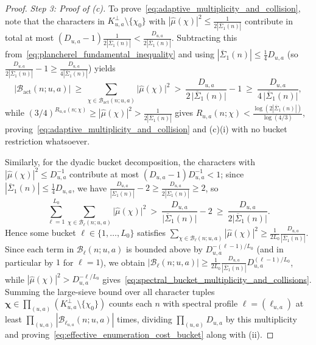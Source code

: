 \documentclass[11pt, a4paper]{article}
\theoremstyle{plain}
\theoremstyle{definition}
\begin{document}
\begin{proof}
\medskip\noindent\emph{Step 3: Proof of (c).}
To prove~\eqref{eq:adaptive_multiplicity_and_collision}, note that the characters in $K_{u,a}^{\perp}\setminus\{\chi_0\}$ with $|\widehat{\mu}(\chi)|^{2}\le\frac{1}{2|\overline{\Sigma}_1(n)|}$ contribute in total at most $(D_{u,a}-1)\frac{1}{2|\overline{\Sigma}_1(n)|}<\frac{D_{u,a}}{2|\overline{\Sigma}_1(n)|}$. Subtracting this from~\eqref{eq:plancherel_fundamental_inequality} and using $|\overline{\Sigma}_1(n)|\le\frac14 D_{u,a}$ (so $\frac{D_{u,a}}{2|\overline{\Sigma}_1(n)|}-1\ge\frac{D_{u,a}}{4|\overline{\Sigma}_1(n)|}$) yields
\[
\big|\mathcal{B}_{\mathrm{act}}(n;u,a)\big|\ \ge\ \sum_{\chi\in\mathcal{B}_{\mathrm{act}}(n;u,a)}\big|\widehat{\mu}(\chi)\big|^{2}\ >\ \frac{D_{u,a}}{2\,\big|\overline{\Sigma}_1(n)\big|}-1\ \ge\ \frac{D_{u,a}}{4\,\big|\overline{\Sigma}_1(n)\big|},
\]
while $(3/4)^{R_{u,a}(n;\chi)}\ge|\widehat{\mu}(\chi)|^{2}>\frac{1}{2|\overline{\Sigma}_1(n)|}$ gives $R_{u,a}(n;\chi)<\frac{\log(2|\overline{\Sigma}_1(n)|)}{\log(4/3)}$, proving~\eqref{eq:adaptive_multiplicity_and_collision} and (c)(i) with no bucket restriction whatsoever. 

Similarly, for the dyadic bucket decomposition, the characters with $|\widehat{\mu}(\chi)|^{2}\le D_{u,a}^{-1}$ contribute at most $(D_{u,a}-1)D_{u,a}^{-1}<1$; since $|\overline{\Sigma}_1(n)|\le\frac14 D_{u,a}$, we have $\frac{D_{u,a}}{|\overline{\Sigma}_1(n)|}-2\ge\frac{D_{u,a}}{2|\overline{\Sigma}_1(n)|}\ge2$, so
\[
\sum_{\ell=1}^{L_0}\sum_{\chi\in\mathcal{B}_\ell(n;u,a)}\big|\widehat{\mu}(\chi)\big|^{2}\ >\ \frac{D_{u,a}}{\big|\overline{\Sigma}_1(n)\big|}-2\ \ge\ \frac{D_{u,a}}{2\big|\overline{\Sigma}_1(n)\big|}.
\]
Hence some bucket $\ell\in\{1,\dots,L_0\}$ satisfies $\sum_{\chi\in\mathcal{B}_\ell(n;u,a)}|\widehat{\mu}(\chi)|^{2}\ge\frac{1}{2L_0}\frac{D_{u,a}}{|\overline{\Sigma}_1(n)|}$. Since each term in $\mathcal{B}_\ell(n;u,a)$ is bounded above by $D_{u,a}^{-(\ell-1)/L_0}$ (and in particular by $1$ for $\ell=1$), we obtain $|\mathcal{B}_\ell(n;u,a)|\ge\frac{1}{2L_0}\frac{D_{u,a}}{|\overline{\Sigma}_1(n)|}D_{u,a}^{(\ell-1)/L_0}$, while $|\widehat{\mu}(\chi)|^{2}>D_{u,a}^{-\ell/L_0}$ gives~\eqref{eq:spectral_bucket_multiplicity_and_collisions}. Summing the large-sieve bound over all character tuples $\boldsymbol{\chi}\in\allowbreak\prod_{(u,a)}(K_{u,a}^{\perp}\setminus\{\chi_0\})$ counts each $n$ with spectral profile $\boldsymbol{\ell}=(\ell_{u,a})$ at least $\prod_{(u,a)}|\mathcal{B}_{\ell_{u,a}}(n;u,a)|$ times, dividing $\prod_{(u,a)}D_{u,a}$ by this multiplicity and proving~\eqref{eq:effective_enumeration_cost_bucket} along with (ii).
\end{proof}
\end{document}
